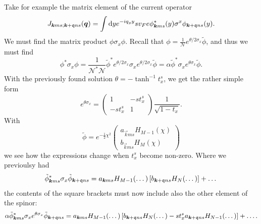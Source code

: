 Take for example the matrix element of the current operator
\[
  J_{\bm{k} m s; \bm{k}+\mathfrak{q} n s } (\bm{q}) = \int \mathrm{d}y e^{-i q_{y} y}
  s v_{F} e \phi ^{*}_{\bm{k} m s} (y) \sigma ^{x} \phi _{\bm{k} + \mathfrak{q} n s}(y).
\]
We must find the matrix product \(\phi \sigma_{x} \phi \).
Recall that \(\phi = \frac{1}{\mathcal{N}} e^{\theta /2 \sigma _{x}} \tilde{\phi} \), and thus we must find
\[
  \phi ^{*} \sigma _{x} \phi
  = \frac{1}{\mathcal{N}^{*} \mathcal{N}} \tilde{\phi}^{*} e^{\theta /2 \sigma _{x}} \sigma _{x} e^{\theta /2 \sigma _{x}} \tilde{\phi}
  =  \alpha \tilde{\phi}^{*} \sigma _{x} e^{\theta \sigma _{x}} \tilde{\phi}.
\]
With the previously found solution \(\theta = - \tanh ^{-1} t^s_{x}\), we get the rather simple form
\[
  e^{\theta \sigma _{x}} =
  \begin{pmatrix}
    1 & - s t^s_{x}\\
    -s t^s_{x} & 1
  \end{pmatrix}
  \frac{1}{\sqrt{1-t_{x}}}.
\]
With
\begin{equation}\label{eq:76}
  \tilde{\phi} = e^{-\frac{1}{2} \chi ^2}
  \begin{pmatrix}
    a_{\vec{k} m s} H_{M-1} (\chi)\\
    b_{\vec{k} m s} H_{M} (\chi)
  \end{pmatrix}
\end{equation}
we see how the expressions change when \(t^s_{x}\) become non-zero.
Where we previoulsy had
\begin{equation}
  \label{eq:77}
  \tilde{\phi}  ^{*}_{\bm{k} m s} \sigma _{x} \tilde{\phi}  _{\bm{k} + \mathfrak{q} n s}
  =
  a_{\bm{k} m s} H_{M-1}(\dots) \left[ b_{\bm{k}+\mathfrak{q} n s} H_{N}(\dots) \right]
  + \dots
\end{equation}
the contents of the square brackets must now include also the other element of the spinor:
\begin{equation}
  \label{eq:78}
  \alpha \tilde{\phi}  ^{*}_{\bm{k} m s} \sigma _{x} e^{\theta \sigma _{x}} \tilde{\phi}  _{\bm{k} + \mathfrak{q} n s}
  =
  a_{\bm{k} m s} H_{M-1}(\dots)
  \left[
    b_{\bm{k}+\mathfrak{q} n s} H_{N}(\dots)
    - s t^s_{x} a_{\bm{k} + \mathfrak{q} n s} H_{N-1} (\dots)
  \right]
  + \dots .
\end{equation}

